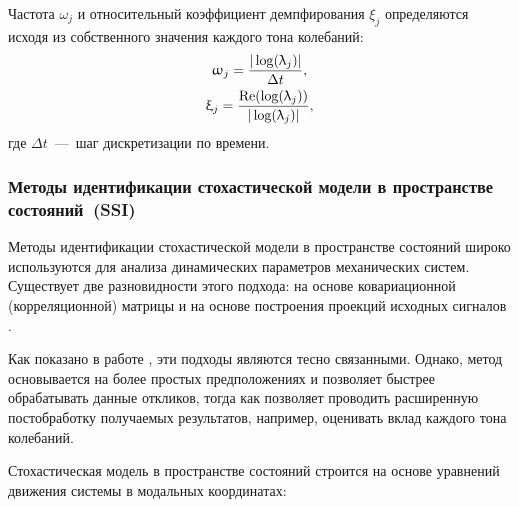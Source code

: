 Частота $ \omega_j $ и относительный коэффициент демпфирования $ \xi_j $ определяются исходя из собственного значения каждого тона колебаний:
\begin{equation}
	\begin{gathered}
		\upomega_j = \frac{|\log(\uplambda_j)|}{\Delta t}, \\
		\upxi_j = \frac{\operatorname{Re}(\log(\uplambda_j))}{|\log(\uplambda_j)|},
	\end{gathered}
\end{equation}
где $ \Delta t $~---~шаг дискретизации по времени.

\subsubsection{Методы идентификации стохастической модели в пространстве состояний~(SSI)}

Методы идентификации стохастической модели в пространстве состояний широко используются для анализа динамических параметров механических систем. Существует две разновидности этого подхода: на основе ковариационной (корреляционной) матрицы  и на основе построения проекций исходных сигналов  \cite{lib:oma:Rainieri}. 

Как показано в работе \cite{lib:oma:Peeters}, эти подходы являются тесно связанными. Однако, метод  основывается на более простых предположениях и позволяет быстрее обрабатывать данные откликов, тогда как  позволяет проводить расширенную постобработку получаемых результатов, например, оценивать вклад каждого тона колебаний.

Стохастическая модель в пространстве состояний строится на основе уравнений движения системы в модальных координатах:

